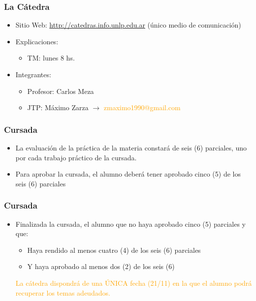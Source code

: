 \begin{frame}
  \frametitle{La Cátedra}
  \begin{itemize}
	  \item Sitio Web: \textcolor{orange}{\url{http://catedras.info.unlp.edu.ar}} (único medio de comunicación)
	  \item Explicaciones:
	  \begin{itemize}
	  	\item TM: lunes 8 hs.
	  \end{itemize}
	  \item Integrantes:
	  \begin{itemize}
	  	\item Profesor: Carlos Meza
	  	\item JTP: Máximo Zarza $\rightarrow$ \textcolor{orange}{zmaximo1990@gmail.com}
	  \end{itemize}
  \end{itemize}
\end{frame}

\begin{frame}
  \frametitle{Cursada}
  \begin{itemize}
	  \item La evaluación de la práctica de la materia constará de seis (6) parciales, uno por cada trabajo práctico de la cursada.
	  \item Para aprobar la cursada, el alumno deberá tener aprobado cinco (5) de los seis (6) parciales
  \end{itemize}
\end{frame}

\begin{frame}
  \frametitle{Cursada}
  \begin{itemize}
	  \item Finalizada la cursada, el alumno que no haya aprobado cinco (5) parciales y que:
	  \begin{itemize}
	  	\item Haya rendido al menos cuatro (4) de los seis (6) parciales
	  	\item Y haya aprobado al menos dos (2) de los seis (6)
	  \end{itemize}
	  
	  \pause
	  \textcolor{orange}{La cátedra dispondrá de una ÚNICA fecha (21/11) en la que el alumno podrá recuperar los temas adeudados.}
  \end{itemize}
\end{frame}


